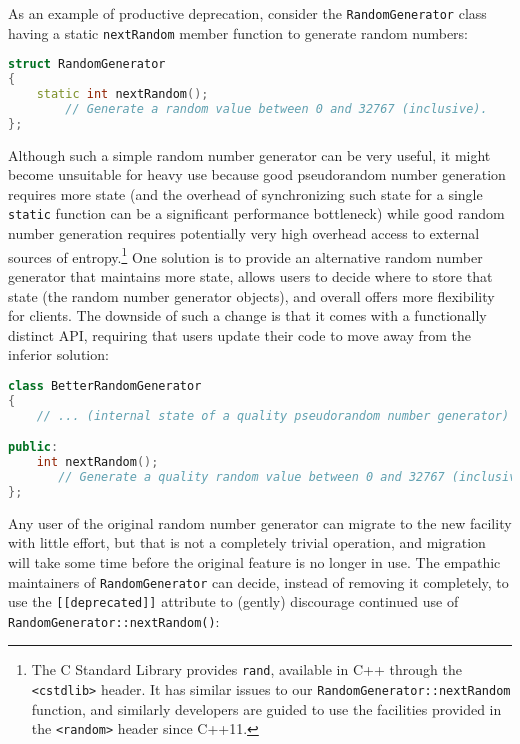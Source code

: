 As an example of productive deprecation, consider the
\texttt{RandomGenerator} class having a static \texttt{nextRandom}
member function to generate random numbers:

\begin{lstlisting}[language=C++]
struct RandomGenerator
{
    static int nextRandom();
        // Generate a random value between 0 and 32767 (inclusive).
};
\end{lstlisting}

\noindent Although such a simple random number generator can be very useful, it
might become unsuitable for heavy use because good pseudorandom number
generation requires more state (and the overhead of synchronizing such
state for a single \texttt{static} function can be a significant
performance bottleneck) while good random number generation requires
potentially very high overhead access to external sources of
entropy.{\cprotect\footnote{The C Standard Library provides
\texttt{rand}, available in C++ through the \texttt{<cstdlib>} header.
It has similar issues to our \texttt{RandomGenerator::nextRandom}
function, and similarly developers are guided to use the facilities
  provided in the \texttt{<random>} header since C++11.}} One
solution is to provide an alternative random number generator that
maintains more state, allows users to decide where to store that state
(the random number generator objects), and overall offers more
flexibility for clients. The downside of such a change is that it comes
with a functionally distinct API, requiring that users update their code
to move away from the inferior solution:

\begin{lstlisting}[language=C++]
class BetterRandomGenerator
{
    // ... (internal state of a quality pseudorandom number generator) ...

public:
    int nextRandom();
       // Generate a quality random value between 0 and 32767 (inclusive).
};
\end{lstlisting}

\noindent Any user of the original random number generator can migrate to the new
facility with little effort, but that is not a completely trivial
operation, and migration will take some time before the original feature is no
longer in use. The empathic maintainers of \texttt{RandomGenerator} can
decide, instead of removing it completely, to use the
\texttt{[[deprecated]]} attribute to (gently) discourage continued use
of \texttt{RandomGenerator::nextRandom()}:


